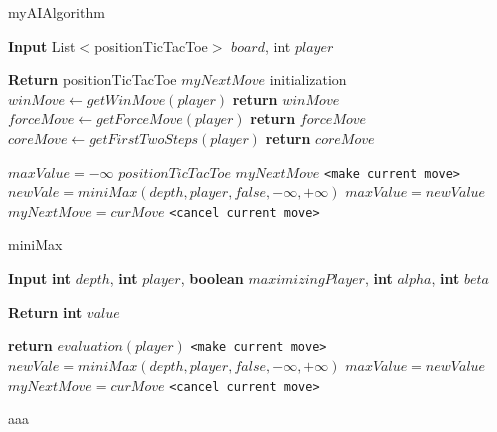 \documentclass[a4paper]{article}
\begin{document}
\begin{algorithm}
\caption{myAIAlgorithm}
\begin{algorithmic}[]

\State \textbf{Input} List$<$positionTicTacToe$>$ $board$, int $player$

\State \textbf{Return} positionTicTacToe $myNextMove$
\State
{}     
\State
\State initialization
\State
\State $ winMove \gets getWinMove(player)$  
    \State  \textbf{return} $winMove$
\EndIf
\State
\State $ forceMove \gets getForceMove(player)$  
    \State  \textbf{return} $forceMove$
\EndIf
\State
\State $ coreMove \gets getFirstTwoSteps(player)$  
    \State  \textbf{return} $coreMove$
\EndIf
\State

\State $maxValue = -\infty$
\State $positionTicTacToe$ $myNextMove$
\State
\Do {}
        \State \texttt{<make current move>}
	  \State $newVale = miniMax(depth, player, false, -\infty, +\infty)$
    	           \State  $maxValue = newValue$
		     \State $myNextMove =curMove$
         \EndIf
	   \State \texttt{<cancel current move>}  
      \EndFor

\EndProcedure
\end{algorithmic}
\end{algorithm}

\begin{algorithm}
\caption{miniMax}
\begin{algorithmic}[]

\State \textbf{Input} \textbf{int} $depth$, \textbf{int} $player$, \textbf{boolean} $maximizingPlayer$, \textbf{int} $alpha$, \textbf{int} $beta$

\State \textbf{Return} \textbf{int} $value$

 
	\State \textbf{return} $evaluation(player)$  
\EndIf
{}  
        \State \texttt{<make current move>}
	  \State $newVale = miniMax(depth, player, false, -\infty, +\infty)$
    	           \State  $maxValue = newValue$
		     \State $myNextMove =curMove$
         \EndIf
	   \State \texttt{<cancel current move>}  
      \EndFor  

\Else  {}
\State aaa
\EndIf


\EndProcedure
\end{algorithmic}
\end{algorithm}
\end{document}
